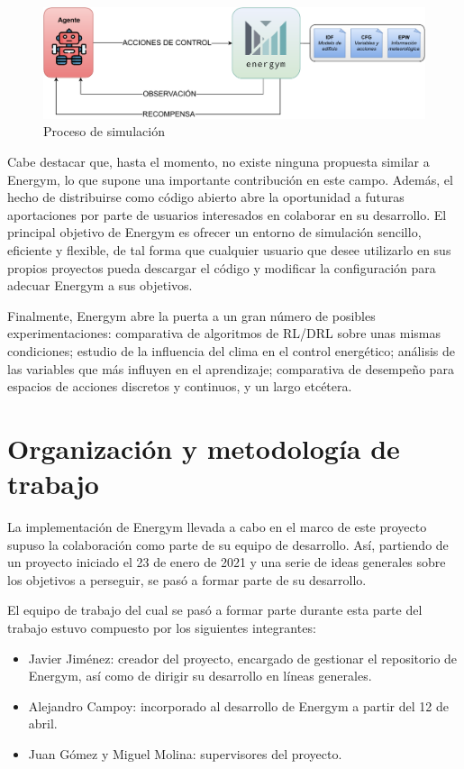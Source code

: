\begin{figure}
    \centering
    \includegraphics[width=\textwidth]{imagenes/operation-diagram.pdf}
    \caption{Proceso de simulación}
    \label{fig:operation-diag}
\end{figure}

Cabe destacar que, hasta el momento, no existe ninguna propuesta similar a Energym, lo que supone una importante contribución en este campo. Además, el hecho de distribuirse como código abierto abre la oportunidad a futuras aportaciones por parte de usuarios interesados en colaborar en su desarrollo. El principal objetivo de Energym es ofrecer un entorno de simulación sencillo, eficiente y flexible, de tal forma que cualquier usuario que desee utilizarlo en sus propios proyectos pueda descargar el código y modificar la configuración para adecuar Energym a sus objetivos.

Finalmente, Energym abre la puerta a un gran número de posibles experimentaciones: comparativa de algoritmos de RL/DRL sobre unas mismas condiciones; estudio de la influencia del clima en el control energético; análisis de las variables que más influyen en el aprendizaje; comparativa de desempeño para espacios de acciones discretos y continuos, y un largo etcétera.

\section{Organización y metodología de trabajo}

La implementación de Energym llevada a cabo en el marco de este proyecto supuso la colaboración como parte de su equipo de desarrollo. Así, partiendo de un proyecto iniciado el 23 de enero de 2021 y una serie de ideas generales sobre los objetivos a perseguir, se pasó a formar parte de su desarrollo.

El equipo de trabajo del cual se pasó a formar parte durante esta parte del trabajo estuvo compuesto por los siguientes integrantes:

\begin{itemize}
    \item Javier Jiménez: creador del proyecto, encargado de gestionar el repositorio de Energym, así como de dirigir su desarrollo en líneas generales.
    \item Alejandro Campoy: incorporado al desarrollo de Energym a partir del 12 de abril.
    \item Juan Gómez y Miguel Molina: supervisores del proyecto.
\end{itemize}

